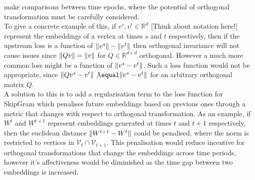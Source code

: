 \documentclass[a4paper]{article}
\renewcommand{\V}{\mathcal V}
\begin{document}
make comparisons between time epochs, where the potential of orthogonal transformation must be carefully considered.\\
To give a concrete example of this,  if $v^s, v^t \in \mathbb{R}^d$ [Think about notation here!] represent the embeddings of a vertex at times $s$ and $t$ respectively, then
if the upstream loss is a function of $\lVert v^s\rVert-\lVert v^t\rVert$ then orthogonal invariance will not cause issues since $\lVert Qv\rVert = \lVert v\rVert$ for $Q \in \mathbb{R}^{d \times d}$ orthogonal.
However a much more common loss might be a function of $\lVert v^s - v^t\rVert$. Such a loss function would not be appropriate, since $\norm{Qv^s - v^t} \not\equal \norm{v^s - v^t}$ for an arbitrary
orthogonal matrix $Q$.\\
A solution to this is to add a regularisation term to the loss function for SkipGram which penalises future embeddings based on previous ones through a metric that changes with respect to orthogonal
transformation. As an example, if $W^t$ and $W^{t+1}$ represent embeddings generated at times $t$ and $t+1$ respectively, then the euclidean distance $\lVert W^{t+1} - W^t\rVert$ could be penalised,
where the norm is restricted to vertices in $\V_t \cap \V_{t+1}$. This penalisation would reduce incentive for orthogonal transformations that change the embeddings across time periods, however it's
affectiveness would be diminished as the time gap between two embeddings is increased.
\end{document}
